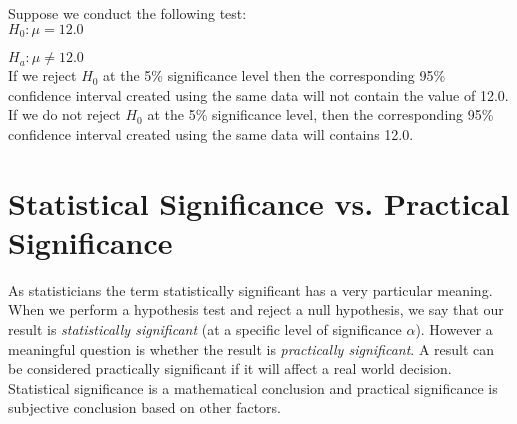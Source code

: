 \begin{example}
Suppose we conduct the following test:\\

\quad\quad	$H_{0}: \mu = 12.0$

\quad\quad	$H_{a}: \mu \neq 12.0$\\

If we reject $H_{0}$ at the 5\% significance level then the 
corresponding 95\% confidence interval created using the same data
will not contain the value of 12.0. If we do not reject $H_{0}$ at the 5\% significance level, then the corresponding 95\% confidence interval created using the same data will contains 12.0.
\end{example}















\section{Statistical Significance vs. Practical Significance}


As statisticians the term statistically significant has a very particular meaning. When we perform a hypothesis test and reject a null hypothesis, we say that our result is \textit{statistically significant} 
(at a specific level of significance $\alpha$). However a meaningful question is whether the result is \textit{practically significant}. A result can be considered practically significant if it will affect a real world decision. Statistical significance is a mathematical conclusion and practical significance is subjective conclusion based on other factors.	


